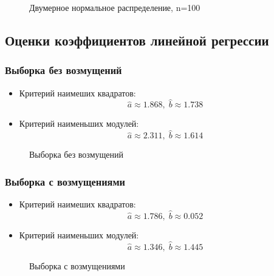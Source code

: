 	\begin{figure}[H]
		\caption{Двумерное нормальное распределение, n=100}
		\label{ris:image}
	\end{figure}

\subsection {Оценки коэффициентов линейной регрессии}
	\subsubsection {Выборка без возмущений}
		\begin{itemize}
			\item {Критерий наимеших квадратов:\\ $$\hat a \approx 1.868, \; \hat b \approx 1.738$$} 
			\item {Критерий наименьших модулей:\\ $$\hat a \approx 2.311, \; \hat b \approx 1.614$$}
		\end{itemize}

		\begin{figure}[H]
			\caption{Выборка без возмущений}
			\label{ris:image}
		\end{figure}
	
	\subsubsection{Выборка с возмущениями}
		\begin{itemize}
			\item {Критерий наимеших квадратов:\\ $$\hat a \approx 1.786, \; \hat b \approx 0.052$$} 
			\item {Критерий наименьших модулей:\\ $$\hat a \approx 1.346, \; \hat b \approx 1.445$$}
		\end{itemize}

		\begin{figure}[H]
			\caption{Выборка с возмущениями}
			\label{ris:image}
		\end{figure}

